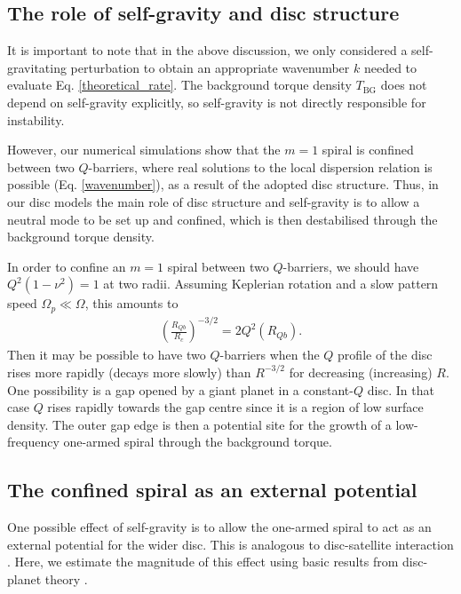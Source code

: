 

\subsection{The role of self-gravity and disc structure} 
It is important to note that in the above discussion, we only considered a self-gravitating
perturbation to obtain an appropriate wavenumber $k$ needed to
evaluate Eq. \ref{theoretical_rate}. 
The background torque density $T_\mathrm{BG}$ does not depend on  
self-gravity explicitly, so self-gravity is not directly
responsible for instability. 

However, 
our numerical simulations show that the $m=1$ spiral is
confined between two $Q$-barriers, where real solutions to the local
dispersion relation is possible (Eq. \ref{wavenumber}), as a result of the adopted disc
structure. Thus, in our disc models the main role of disc structure and self-gravity is to 
allow a neutral mode to be set up and confined, which is then
destabilised through the background torque density. 

In order to confine an $m=1$ spiral between two $Q$-barriers, we
should have $Q^2(1-\nu^2)=1$ at two radii. Assuming 
Keplerian rotation and a slow pattern speed $\Omega_p\ll\Omega$, this amounts to
\begin{align}
  \left(\frac{R_{Qb}}{R_c}\right)^{-3/2} = 2Q^2(R_{Qb}). 
\end{align}
Then it may be possible to have two $Q$-barriers when the $Q$ profile
of the disc rises more rapidly (decays more slowly) than $R^{-3/2}$
for decreasing (increasing) $R$. One possibility is a gap
opened by a giant planet in a constant-$Q$ disc. In that case $Q$
rises rapidly towards the gap centre since it is a region of low
surface density. The outer gap edge is then a potential site for the
growth of a low-frequency one-armed spiral through the background
torque. 



\subsection{The confined spiral as an external potential}
One possible effect of self-gravity is to allow the one-armed spiral  
to act as an external potential for the wider disc. This is
analogous to disc-satellite interaction 
\citep{goldreich79}. Here, we estimate the magnitude of this effect
using basic results from disc-planet theory \citep[see, e.g.][and
references therein]{papaloizou07}.  

